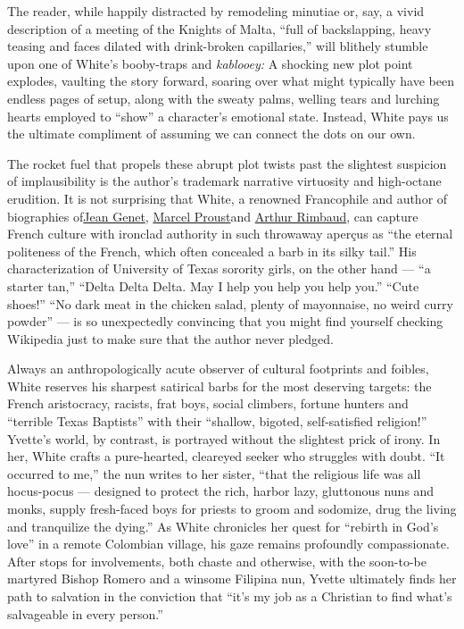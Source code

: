 The reader, while happily distracted by remodeling minutiae or, say, a
vivid description of a meeting of the Knights of Malta, ``full of
backslapping, heavy teasing and faces dilated with drink-broken
capillaries,'' will blithely stumble upon one of White's booby-traps and
\emph{kablooey:} A shocking new plot point explodes, vaulting the story
forward, soaring over what might typically have been endless pages of
setup, along with the sweaty palms, welling tears and lurching hearts
employed to ``show'' a character's emotional state. Instead, White pays
us the ultimate compliment of assuming we can connect the dots on our
own.

The rocket fuel that propels these abrupt plot twists past the slightest
suspicion of implausibility is the author's trademark narrative
virtuosity and high-octane erudition. It is not surprising that White, a
renowned Francophile and author of biographies
of\href{https://www.nytimes3xbfgragh.onion/1993/11/07/books/the-high-priest-of-apostasy.html}{Jean
Genet},
\href{https://www.nytimes3xbfgragh.onion/1999/01/10/books/biography-the-short-form.html}{Marcel
Proust}and
\href{https://www.nytimes3xbfgragh.onion/2008/10/12/books/review/Hell-t.html}{Arthur
Rimbaud}, can capture French culture with ironclad authority in such
throwaway aperçus as ``the eternal politeness of the French, which often
concealed a barb in its silky tail.'' His characterization of University
of Texas sorority girls, on the other hand --- ``a starter tan,''
``Delta Delta Delta. May I help you help you help you.'' ``Cute shoes!''
``No dark meat in the chicken salad, plenty of mayonnaise, no weird
curry powder'' --- is so unexpectedly convincing that you might find
yourself checking Wikipedia just to make sure that the author never
pledged.

Always an anthropologically acute observer of cultural footprints and
foibles, White reserves his sharpest satirical barbs for the most
deserving targets: the French aristocracy, racists, frat boys, social
climbers, fortune hunters and ``terrible Texas Baptists'' with their
``shallow, bigoted, self-satisfied religion!'' Yvette's world, by
contrast, is portrayed without the slightest prick of irony. In her,
White crafts a pure-hearted, cleareyed seeker who struggles with doubt.
``It occurred to me,'' the nun writes to her sister, ``that the
religious life was all hocus-pocus --- designed to protect the rich,
harbor lazy, gluttonous nuns and monks, supply fresh-faced boys for
priests to groom and sodomize, drug the living and tranquilize the
dying.'' As White chronicles her quest for ``rebirth in God's love'' in
a remote Colombian village, his gaze remains profoundly compassionate.
After stops for involvements, both chaste and otherwise, with the
soon-to-be martyred Bishop Romero and a winsome Filipina nun, Yvette
ultimately finds her path to salvation in the conviction that ``it's my
job as a Christian to find what's salvageable in every person.''

